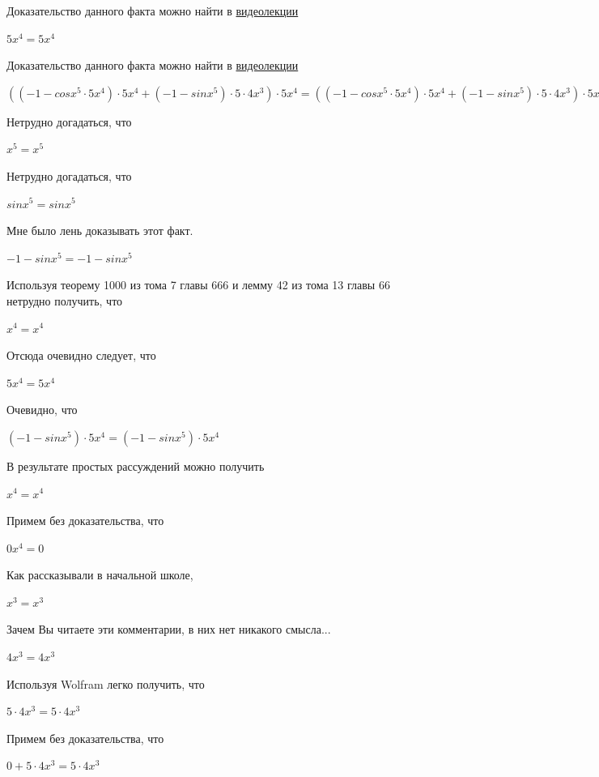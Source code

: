 \documentclass[12pt,a4paper,fleqn]{article}
\theoremstyle{definition}
\begin{document}
Доказательство данного факта можно найти в \href{https://www.youtube.com/watch?v=dQw4w9WgXcQ}{видеолекции} 

$ 5 { x }^{ 4 } =  5 { x }^{ 4 }$

Доказательство данного факта можно найти в \href{https://www.youtube.com/watch?v=dQw4w9WgXcQ}{видеолекции} 

$(( -1  - cos{ x }^{ 5 } \cdot  5 { x }^{ 4 }) \cdot  5 { x }^{ 4 } + ( -1  - sin{ x }^{ 5 }) \cdot  5  \cdot  4 { x }^{ 3 }) \cdot  5 { x }^{ 4 } = (( -1  - cos{ x }^{ 5 } \cdot  5 { x }^{ 4 }) \cdot  5 { x }^{ 4 } + ( -1  - sin{ x }^{ 5 }) \cdot  5  \cdot  4 { x }^{ 3 }) \cdot  5 { x }^{ 4 }$

Нетрудно догадаться, что 

${ x }^{ 5 } = { x }^{ 5 }$

Нетрудно догадаться, что 

$sin{ x }^{ 5 } = sin{ x }^{ 5 }$

Мне было лень доказывать этот факт.

$ -1  - sin{ x }^{ 5 } =  -1  - sin{ x }^{ 5 }$

Используя теорему 1000 из тома 7 главы 666 и лемму 42 из тома 13 главы 66 нетрудно получить, что 

${ x }^{ 4 } = { x }^{ 4 }$

Отсюда очевидно следует, что 

$ 5 { x }^{ 4 } =  5 { x }^{ 4 }$

Очевидно, что 

$( -1  - sin{ x }^{ 5 }) \cdot  5 { x }^{ 4 } = ( -1  - sin{ x }^{ 5 }) \cdot  5 { x }^{ 4 }$

В результате простых рассуждений можно получить 

${ x }^{ 4 } = { x }^{ 4 }$

Примем без доказательства, что 

$ 0 { x }^{ 4 } =  0 $

Как рассказывали в начальной школе, 

${ x }^{ 3 } = { x }^{ 3 }$

Зачем Вы читаете эти комментарии, в них нет никакого смысла... 

$ 4 { x }^{ 3 } =  4 { x }^{ 3 }$

Используя Wolfram легко получить, что 

$ 5  \cdot  4 { x }^{ 3 } =  5  \cdot  4 { x }^{ 3 }$

Примем без доказательства, что 

$ 0  +  5  \cdot  4 { x }^{ 3 } =  5  \cdot  4 { x }^{ 3 }$
\end{document}
